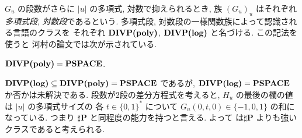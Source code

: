 $G_u$ の段数がさらに $|u|$ の多項式, 対数で抑えられるとき, 
族 $(G_u) _u$ はそれぞれ\emph{多項式段}, \emph{対数段}であるという. 
多項式段, 対数段の一様関数族によって認識される言語のクラスを
それぞれ $\text{\bf DIVP(poly)}$, $\text{\bf DIVP(log)}$ と名づける.
この記法を使うと
河村の論文では次が示されている.

 \begin{lemma}
  \label{WeakFeedback}
  $\text{\bf DIVP(poly)} = {\bf PSPACE}$.
 \end{lemma}

$\text{\bf DIVP(log)} \subseteq \text{\bf DIVP(poly)} = {\bf PSPACE}$ であるが, 
$\text{\bf DIVP(log)} = {\bf PSPACE}$ か否かは未解決である.
 段数が2段の差分方程式を考えると,
 $H_u$ の最後の欄の値は
 $|u|$ の多項式サイズの 各 $t \in \{0,1\}^*$ について
 $G_u(0, t, 0) \in \{-1, 0, 1\}$ の和になっている.
 つまり $\sharp${\bf P} と同程度の能力を持つと言える.
 よって \DIVPlog は$\sharp${\bf P} よりも強いクラスであると考えられる.
